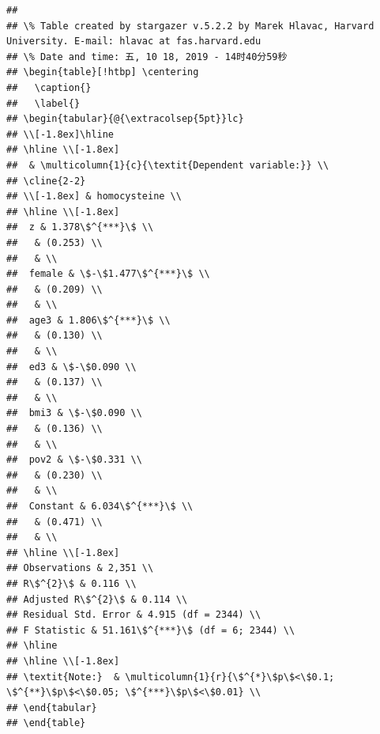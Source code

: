\documentclass[]{article}
\begin{document}
\begin{verbatim}
## 
## \% Table created by stargazer v.5.2.2 by Marek Hlavac, Harvard University. E-mail: hlavac at fas.harvard.edu
## \% Date and time: 五, 10 18, 2019 - 14时40分59秒
## \begin{table}[!htbp] \centering 
##   \caption{} 
##   \label{} 
## \begin{tabular}{@{\extracolsep{5pt}}lc} 
## \\[-1.8ex]\hline 
## \hline \\[-1.8ex] 
##  & \multicolumn{1}{c}{\textit{Dependent variable:}} \\ 
## \cline{2-2} 
## \\[-1.8ex] & homocysteine \\ 
## \hline \\[-1.8ex] 
##  z & 1.378\$^{***}\$ \\ 
##   & (0.253) \\ 
##   & \\ 
##  female & \$-\$1.477\$^{***}\$ \\ 
##   & (0.209) \\ 
##   & \\ 
##  age3 & 1.806\$^{***}\$ \\ 
##   & (0.130) \\ 
##   & \\ 
##  ed3 & \$-\$0.090 \\ 
##   & (0.137) \\ 
##   & \\ 
##  bmi3 & \$-\$0.090 \\ 
##   & (0.136) \\ 
##   & \\ 
##  pov2 & \$-\$0.331 \\ 
##   & (0.230) \\ 
##   & \\ 
##  Constant & 6.034\$^{***}\$ \\ 
##   & (0.471) \\ 
##   & \\ 
## \hline \\[-1.8ex] 
## Observations & 2,351 \\ 
## R\$^{2}\$ & 0.116 \\ 
## Adjusted R\$^{2}\$ & 0.114 \\ 
## Residual Std. Error & 4.915 (df = 2344) \\ 
## F Statistic & 51.161\$^{***}\$ (df = 6; 2344) \\ 
## \hline 
## \hline \\[-1.8ex] 
## \textit{Note:}  & \multicolumn{1}{r}{\$^{*}\$p\$<\$0.1; \$^{**}\$p\$<\$0.05; \$^{***}\$p\$<\$0.01} \\ 
## \end{tabular} 
## \end{table}
\end{verbatim}
\end{document}
